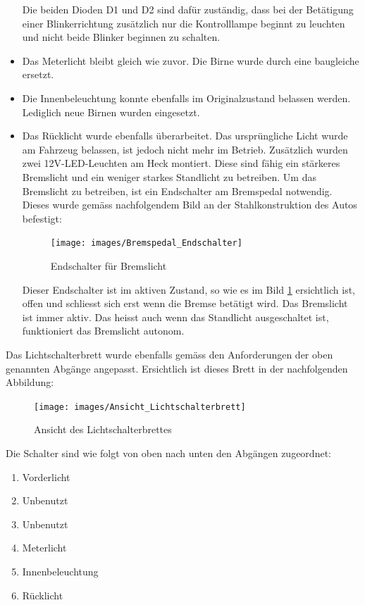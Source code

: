 \begin{itemize}
Die beiden Dioden D1 und D2 sind dafür zuständig, dass bei der Betätigung einer Blinkerrichtung zusätzlich nur die Kontrolllampe beginnt zu leuchten und nicht beide Blinker beginnen zu schalten.
\item Das Meterlicht bleibt gleich wie zuvor. Die Birne wurde durch eine baugleiche ersetzt.
\item Die Innenbeleuchtung konnte ebenfalls im Originalzustand belassen werden. Lediglich neue Birnen wurden eingesetzt.
\newpage
\item Das Rücklicht wurde ebenfalls überarbeitet. Das ursprüngliche Licht wurde am Fahrzeug belassen, ist jedoch nicht mehr im Betrieb. Zusätzlich wurden zwei 12V-LED-Leuchten am Heck montiert. Diese sind fähig ein stärkeres Bremslicht und ein weniger starkes Standlicht zu betreiben. Um das Bremslicht zu betreiben, ist ein Endschalter am Bremspedal notwendig. Dieses wurde gemäss nachfolgendem Bild an der Stahlkonstruktion des Autos befestigt:

\begin{figure}[h!]
	\centering
		\texttt{[image: images/Bremspedal\_Endschalter]}
	\caption{Endschalter für Bremslicht}
	\label{fig:EndschalterBremslicht}
\end{figure}

Dieser Endschalter ist im aktiven Zustand, so wie es im Bild \ref{fig:EndschalterBremslicht} ersichtlich ist, offen und schliesst sich erst wenn die Bremse betätigt wird. Das Bremslicht ist immer aktiv. Das heisst auch wenn das Standlicht ausgeschaltet ist, funktioniert das Bremslicht autonom.

\end{itemize}

\newpage

Das Lichtschalterbrett wurde ebenfalls gemäss den Anforderungen der oben genannten Abgänge angepasst. Ersichtlich ist dieses Brett in der nachfolgenden Abbildung:

\begin{figure}[h!]
	\centering
		\texttt{[image: images/Ansicht\_Lichtschalterbrett]}
	\caption{Ansicht des Lichtschalterbrettes}
	\label{fig:AnsichtLichtschalterbrett}
\end{figure}

Die Schalter sind wie folgt von oben nach unten den Abgängen zugeordnet:

\begin{enumerate}
\item Vorderlicht
\item Unbenutzt
\item Unbenutzt
\item Meterlicht
\item Innenbeleuchtung
\item Rücklicht
\end{enumerate}

\color{black}
\newpage